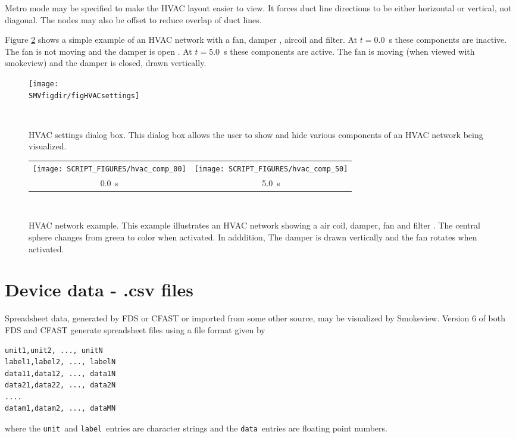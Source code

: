 \documentclass[11pt,twoside]{book}
\begin{document}
Metro mode may be specified to make the HVAC layout easier to view.  It forces duct line directions to be either horizontal or vertical, not diagonal. The nodes may also be
offset to reduce overlap of duct lines.

Figure \ref{figHVACexample} shows a simple example of an HVAC network with a fan, damper , aircoil
and filter.  At $t=0.0$~s these components are inactive.  The fan is not moving and
the damper is open .
At $t=5.0$~s these components are active.  The fan is moving (when viewed with smokeview)
 and the damper is closed, drawn vertically.

\begin{figure}[bph]
\begin{center}
\texttt{[image: \\SMVfigdir/figHVACsettings]}
\end{center}
\caption[HVAC settings dialog box.]{HVAC settings dialog box.
This dialog box allows the user to show and hide various components of an HVAC
network being visualized.}\ \label{figHVACsettings}
\end{figure}


\begin{figure}[bph]
\begin{center}
\begin{tabular}{cc}
\texttt{[image: SCRIPT\_FIGURES/hvac\_comp\_00]}&
\texttt{[image: SCRIPT\_FIGURES/hvac\_comp\_50]}\\
0.0~s&5.0~s
\end{tabular}
\end{center}
\caption[HVAC network example.]{HVAC network example.
This example illustrates an HVAC network showing a air coil, damper, fan and filter . The central sphere
changes from green to color when activated.
In adddition, The damper is drawn vertically and the fan rotates when activated.}\ \label{figHVACexample}
\end{figure}


\section{Device data - .csv files}
Spreadsheet data, generated by FDS or CFAST or imported from some
other source, may be visualized by Smokeview.
Version 6 of both FDS and CFAST
generate spreadsheet files using a file format given by
\begin{lstlisting}
unit1,unit2, ..., unitN
label1,label2, ..., labelN
data11,data12, ..., data1N
data21,data22, ..., data2N
....
datam1,datam2, ..., dataMN
\end{lstlisting}
where the {\tt unit}\ and {\tt label}\ entries are character strings and the
{\tt data}\ entries are floating point numbers.
\end{document}
